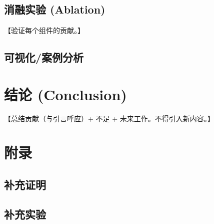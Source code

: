 \documentclass[12pt,a4paper]{article}
\begin{document}
\subsection{消融实验 (Ablation)}
【验证每个组件的贡献。】
\subsection{可视化/案例分析}

\section{结论 (Conclusion)}
【总结贡献（与引言呼应）+ 不足 + 未来工作。不得引入新内容。】





\appendix
\section*{附录}
\subsection{补充证明}
\subsection{补充实验}
\end{document}

